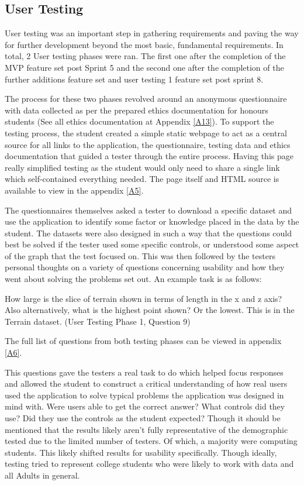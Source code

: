 \subsection{User Testing} \label{usertest1}
User testing was an important step in gathering requirements and paving the way for further development beyond the most basic, fundamental requirements. In total, 2 User testing phases were ran. The first one after the completion of the MVP feature set post Sprint 5 and the second one after the completion of the further additions feature set and user testing 1 feature set post sprint 8.

The process for these two phases revolved around an anonymous questionnaire with data collected as per the prepared ethics documentation for honours students (See all ethics documentation at Appendix \ref{A13}). To support the testing process, the student created a simple static webpage to act as a central source for all links to the application, the questionnaire, testing data and ethics documentation that guided a tester through the entire process. Having this page really simplified testing as the student would only need to share a single link which self-contained everything needed. The page itself and HTML source is available to view in the appendix \ref{A5}.

The questionnaires themselves asked a tester to download a specific dataset and use the application to identify some factor or knowledge placed in the data by the student. The datasets were also designed in such a way that the questions could best be solved if the tester used some specific controls, or understood some aspect of the graph that the test focused on. This was then followed by the testers personal thoughts on a variety of questions concerning usability and how they went about solving the problems set out. An example task is as follows:

\begin{displayquote}
    How large is the slice of terrain shown in terms of length in the x and z axis? Also alternatively, what is the highest point shown? Or the lowest. This is in the Terrain dataset. (User Testing Phase 1, Question 9)
\end{displayquote}

The full list of questions from both testing phases can be viewed in appendix \ref{A6}.

This questions gave the testers a real task to do which helped focus responses and allowed the student to construct a critical understanding of how real users used the application to solve typical problems the application was designed in mind with. Were users able to get the correct answer? What controls did they use? Did they use the controls as the student expected? Though it should be mentioned that the results likely aren't fully representative of the demographic tested due to the limited number of testers. Of which, a majority were computing students. This likely shifted results for usability specifically. Though ideally, testing tried to represent college students who were likely to work with data and all Adults in general.

